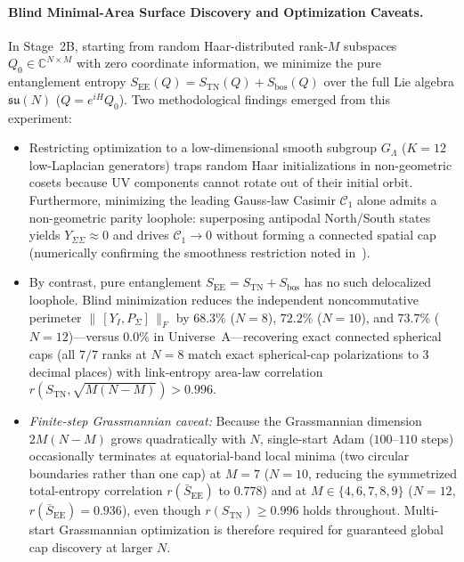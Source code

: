 \documentclass[11pt,a4paper]{article}
\begin{document}
\paragraph{Blind Minimal-Area Surface Discovery and Optimization Caveats.}
In Stage~2B, starting from random Haar-distributed rank-$M$ subspaces $Q_0 \in \mathbb{C}^{N\times M}$ with zero coordinate information, we minimize the pure entanglement entropy $S_{\mathrm{EE}}(Q) = S_{\mathrm{TN}}(Q) + S_{\mathrm{bos}}(Q)$ over the full Lie algebra $\mathfrak{su}(N)$ ($Q = e^{i H} Q_0$). Two methodological findings emerged from this experiment:
\begin{itemize}
  \item Restricting optimization to a low-dimensional smooth subgroup $G_\Lambda$ ($K=12$ low-Laplacian generators) traps random Haar initializations in non-geometric cosets because UV components cannot rotate out of their initial orbit. Furthermore, minimizing the leading Gauss-law Casimir $\mathcal{C}_1$ alone admits a non-geometric parity loophole: superposing antipodal North/South states yields $Y_{\Sigma\Sigma} \approx 0$ and drives $\mathcal{C}_1 \to 0$ without forming a connected spatial cap (numerically confirming the smoothness restriction noted in~\cite{Fliss2025}).
  \item By contrast, pure entanglement $S_{\mathrm{EE}} = S_{\mathrm{TN}} + S_{\mathrm{bos}}$ has no such delocalized loophole. Blind minimization reduces the independent noncommutative perimeter $\|\,[Y_I, P_\Sigma]\,\|_F$ by $68.3\%$ ($N=8$), $72.2\%$ ($N=10$), and $73.7\%$ ($N=12$)---versus $0.0\%$ in Universe~A---recovering exact connected spherical caps (all $7/7$ ranks at $N=8$ match exact spherical-cap polarizations to 3 decimal places) with link-entropy area-law correlation $r(S_{\mathrm{TN}}, \sqrt{M(N-M)}) > 0.996$.
  \item \emph{Finite-step Grassmannian caveat:} Because the Grassmannian dimension $2M(N-M)$ grows quadratically with $N$, single-start Adam ($100$--$110$ steps) occasionally terminates at equatorial-band local minima (two circular boundaries rather than one cap) at $M=7$ ($N=10$, reducing the symmetrized total-entropy correlation $r(\bar{S}_{\mathrm{EE}})$ to $0.778$) and at $M\in\{4,6,7,8,9\}$ ($N=12$, $r(\bar{S}_{\mathrm{EE}}) = 0.936$), even though $r(S_{\mathrm{TN}}) \ge 0.996$ holds throughout. Multi-start Grassmannian optimization is therefore required for guaranteed global cap discovery at larger $N$.
\end{itemize}
\end{document}
